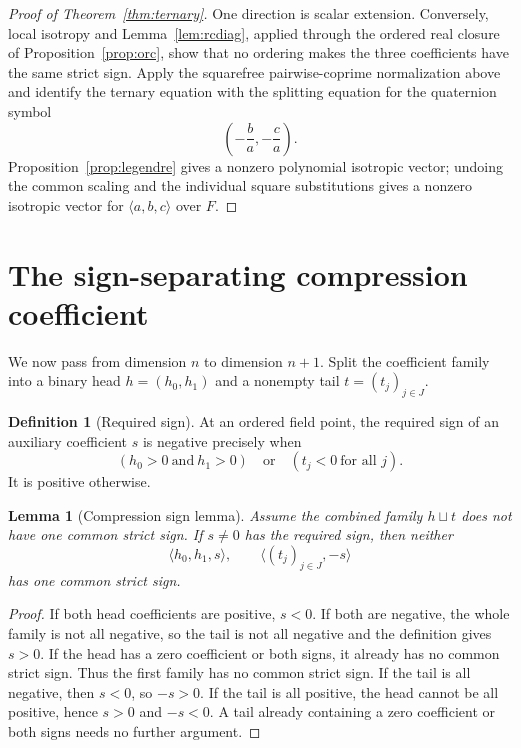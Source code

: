 \documentclass[uplatex,dvipdfmx]{jsarticle}
\newtheorem{lemma}[theorem]{Lemma}
\theoremstyle{definition}
\newtheorem{definition}[theorem]{Definition}
\theoremstyle{remark}
\begin{document}
\begin{proof}[Proof of Theorem~\ref{thm:ternary}]
One direction is scalar extension.  Conversely, local isotropy and
Lemma~\ref{lem:rcdiag}, applied through the ordered real closure of
Proposition~\ref{prop:orc}, show that no ordering makes the three coefficients
have the same strict sign.  Apply the squarefree pairwise-coprime
normalization above and identify the ternary equation with the splitting
equation for the quaternion symbol
\[
  \left(-\frac ba,-\frac ca\right).
\]
Proposition~\ref{prop:legendre} gives a nonzero polynomial isotropic vector;
undoing the common scaling and the individual square substitutions gives a
nonzero isotropic vector for $\langle a,b,c\rangle$ over $F$.
\end{proof}

\section{The sign-separating compression coefficient}

We now pass from dimension $n$ to dimension $n+1$.  Split the coefficient
family into a binary head $h=(h_0,h_1)$ and a nonempty tail
$t=(t_j)_{j\in J}$.

\begin{definition}[Required sign]\label{def:reqsign}
At an ordered field point, the required sign of an auxiliary coefficient
$s$ is negative precisely when
\[
  (h_0>0\ \text{and}\ h_1>0)
  \quad\text{or}\quad
  (t_j<0\ \text{for all }j).
\]
It is positive otherwise.
\end{definition}

\begin{lemma}[Compression sign lemma]\label{lem:compress-sign}
Assume the combined family $h\sqcup t$ does not have one common strict sign.
If $s\ne0$ has the required sign, then neither
\[
  \langle h_0,h_1,s\rangle,
  \qquad
  \langle (t_j)_{j\in J},-s\rangle
\]
has one common strict sign.
\end{lemma}
\begin{proof}
If both head coefficients are positive, $s<0$.  If both are negative, the
whole family is not all negative, so the tail is not all negative and the
definition gives $s>0$.  If the head has a zero coefficient or both signs,
it already has no common strict sign.  Thus the first family has no common
strict sign.  If the tail
is all negative, then $s<0$, so $-s>0$.  If the tail is all positive, the
head cannot be all positive, hence $s>0$ and $-s<0$.  A tail already
containing a zero coefficient or both signs needs no further argument.
\end{proof}
\end{document}
